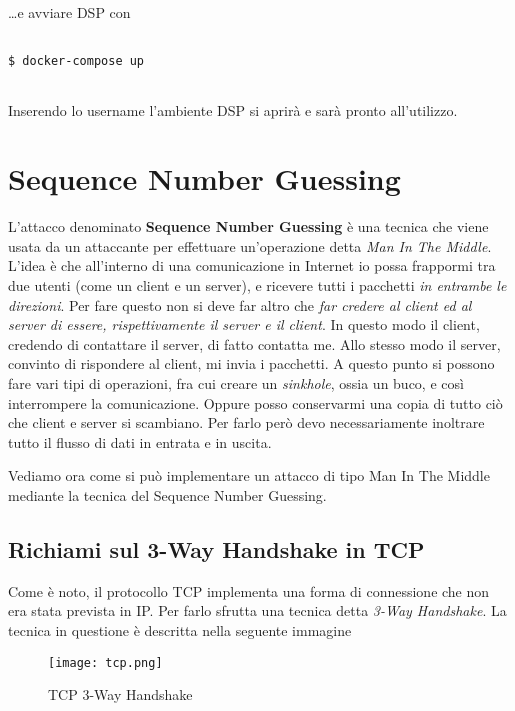 \documentclass[14pt]{extreport}
\begin{document}
\ldots e avviare DSP con

\vspace{10pt}

{
\small
\begin{tcolorbox}

\begin{verbatim}

$ docker-compose up
  
\end{verbatim}

\end{tcolorbox}
}

Inserendo lo username l'ambiente DSP si aprirà e sarà pronto all'utilizzo.


\section{Sequence Number Guessing}
L'attacco denominato \textbf{Sequence Number Guessing} è una tecnica che viene usata da un attaccante per effettuare un'operazione detta \textit{Man In The Middle}. L'idea è che all'interno di una comunicazione in Internet io possa frappormi tra due utenti (come un client e un server), e ricevere tutti i pacchetti \textit{in entrambe le direzioni}. Per fare questo non si deve far altro che \textit{far credere al client ed al server di essere, rispettivamente il server e il client}. In questo modo il client, credendo di contattare il server, di fatto contatta me. Allo stesso modo il server, convinto di rispondere al client, mi invia i pacchetti. A questo punto si possono fare vari tipi di operazioni, fra cui creare un \textit{sinkhole}, ossia un buco, e così interrompere la comunicazione. Oppure posso conservarmi una copia di tutto ciò che client e server si scambiano. Per farlo però devo necessariamente inoltrare tutto il flusso di dati in entrata e in uscita.

Vediamo ora come si può implementare un attacco di tipo Man In The Middle mediante la tecnica del Sequence Number Guessing.

\subsection{Richiami sul 3-Way Handshake in TCP}
Come è noto, il protocollo TCP implementa una forma di connessione che non era stata prevista in IP. Per farlo sfrutta una tecnica detta \textit{3-Way Handshake}. La tecnica in questione è descritta nella seguente immagine


\begin{figure}[H]
    \centering
    \texttt{[image: tcp.png]}
    \caption{TCP 3-Way Handshake}
    \label{tcp}
\end{figure}
\end{document}
